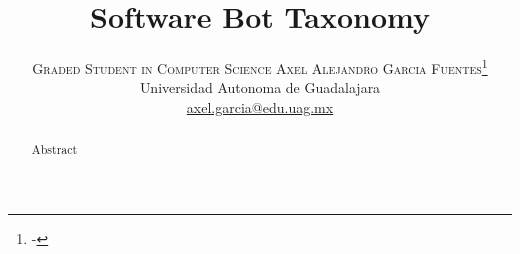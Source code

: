 \documentclass[twoside]{article}
\title{\vspace{-15mm}\fontsize{24pt}{10pt}\selectfont\textbf{Software Bot Taxonomy}} %
\author{
\large
\textsc{Graded Student in Computer Science Axel Alejandro Garcia Fuentes}\thanks{-}\\[2mm] %
\normalsize Universidad Autonoma de Guadalajara \\ %
\normalsize \href{mailto:axel.garcia@edu.uag.mx}{axel.garcia@edu.uag.mx} %
\vspace{-5mm}
}
\date{}
\begin{document}
\maketitle %

\thispagestyle{fancy} %


\begin{abstract}

Abstract
\end{abstract}

\end{document}
